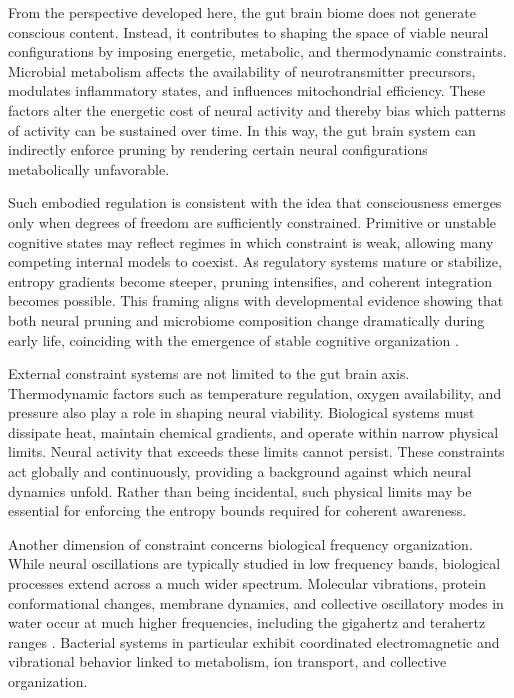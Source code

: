 \documentclass[12pt,letterpaper]{article}
\begin{document}
From the perspective developed here, the gut brain biome does not generate conscious content. Instead, it contributes to shaping the space of viable neural configurations by imposing energetic, metabolic, and thermodynamic constraints. Microbial metabolism affects the availability of neurotransmitter precursors, modulates inflammatory states, and influences mitochondrial efficiency. These factors alter the energetic cost of neural activity and thereby bias which patterns of activity can be sustained over time. In this way, the gut brain system can indirectly enforce pruning by rendering certain neural configurations metabolically unfavorable.

Such embodied regulation is consistent with the idea that consciousness emerges only when degrees of freedom are sufficiently constrained. Primitive or unstable cognitive states may reflect regimes in which constraint is weak, allowing many competing internal models to coexist. As regulatory systems mature or stabilize, entropy gradients become steeper, pruning intensifies, and coherent integration becomes possible. This framing aligns with developmental evidence showing that both neural pruning and microbiome composition change dramatically during early life, coinciding with the emergence of stable cognitive organization \cite{johnson2018, kundu2017}.

External constraint systems are not limited to the gut brain axis. Thermodynamic factors such as temperature regulation, oxygen availability, and pressure also play a role in shaping neural viability. Biological systems must dissipate heat, maintain chemical gradients, and operate within narrow physical limits. Neural activity that exceeds these limits cannot persist. These constraints act globally and continuously, providing a background against which neural dynamics unfold. Rather than being incidental, such physical limits may be essential for enforcing the entropy bounds required for coherent awareness.

Another dimension of constraint concerns biological frequency organization. While neural oscillations are typically studied in low frequency bands, biological processes extend across a much wider spectrum. Molecular vibrations, protein conformational changes, membrane dynamics, and collective oscillatory modes in water occur at much higher frequencies, including the gigahertz and terahertz ranges \cite{froehlich1968, pokorny2004}. Bacterial systems in particular exhibit coordinated electromagnetic and vibrational behavior linked to metabolism, ion transport, and collective organization.
\end{document}
